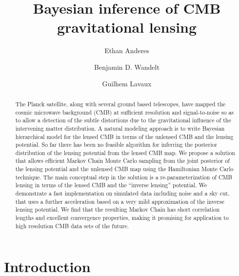 \documentclass[iop,revtex4,apj,onecolumn]{emulateapj}
\begin{document}
\title{Bayesian inference of CMB gravitational lensing}

\author{Ethan Anderes}

\author{Benjamin D. Wandelt}
\author{Guilhem Lavaux}



\begin{abstract} 
The Planck satellite, along with several ground based telescopes, have mapped the  cosmic microwave background (CMB) at sufficient resolution and signal-to-noise so as to allow a detection of the subtle distortions  due to the gravitational influence of the intervening  matter distribution. A natural modeling approach is to write Bayesian hierarchical model for the lensed CMB in terms of the unlensed CMB and the lensing potential. So far there has been no feasible algorithm for inferring the posterior distribution of the lensing potential from the lensed CMB map. We propose a solution that allows efficient Markov Chain Monte Carlo sampling from the joint posterior of the lensing potential and the unlensed CMB map using the Hamiltonian Monte Carlo technique. The main conceptual step in the solution is  a re-parameterization of CMB lensing in terms of the lensed CMB and the ``inverse lensing'' potential. We demonstrate a fast implementation on simulated data including noise and a sky cut, that uses a further acceleration based on a very mild approximation of the inverse lensing potential.  We find that the resulting Markov Chain has short correlation lengths and excellent convergence properties, making it promising for application to high resolution CMB data sets of the future.
\end{abstract}




\section{Introduction}
\end{document}
